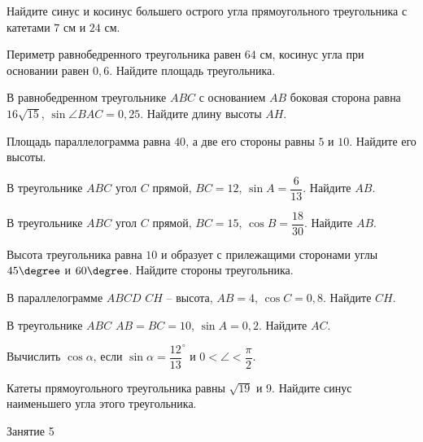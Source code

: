 \begin{class}[number=4]
\begin{listofex}[resume]
		\item Найдите синус и косинус  большего острого угла прямоугольного треугольника с катетами \( 7 \) см и \( 24  \) см.
		\item Периметр равнобедренного треугольника равен \( 64 \) см, косинус угла при основании равен \( 0,6 \). Найдите площадь треугольника.
		\item В равнобедренном треугольнике \( ABC \) с основанием \( AB \) боковая сторона равна \( 16\sqrt{15} \),  \( \sin\angle BAC=0,25 \). Найдите длину высоты \( AH \).
		\item Площадь параллелограмма равна \( 40 \), а две его стороны равны \( 5  \) и \( 10 \). Найдите его высоты.
	\end{listofex}
\end{class}

\begin{homework}[number=2]
	\begin{listofex}
		\item В треугольнике \( ABC \) угол \( C \) прямой, \( BC=12 \), \( \sin A=\dfrac{6}{13} \). Найдите \( AB \).
		\item В треугольнике \( ABC \) угол \( C \) прямой, \( BC=15 \), \( \cos B=\dfrac{18}{30} \). Найдите \( AB \).
		\item  Высота треугольника равна \( 10 \) и образует с прилежащими сторонами углы \( 45\degree \) и \( 60\degree \). Найдите стороны треугольника.
		\item  В параллелограмме \( ABCD \) \( CH \) – высота, \( AB = 4 \), \( \cos C = 0,8 \). Найдите \( CH \).
		\item  В треугольнике \( ABC \) \( AB = BC = 10 \), \( \sin A = 0,2 \). Найдите \( AC \).
		\item Вычислить \( \cos \alpha \), если \( \sin \alpha =\dfrac{12}{13}^{\circ} \)	и \( 0 < \angle < \dfrac{\pi}{2} \).
		\item Катеты прямоугольного треугольника равны \( \sqrt{19} \) и 9. Найдите синус наименьшего угла этого треугольника.
	\end{listofex}
\end{homework}

\begin{class}[number=5]
	\begin{listofex}
		\item Занятие 5
	\end{listofex}
\end{class}

